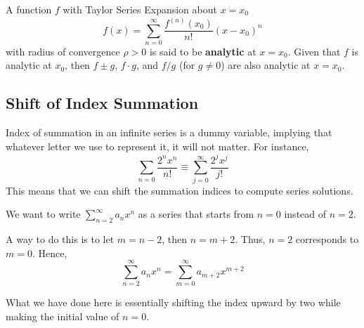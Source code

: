 A function $f$ with Taylor Series Expansion about $x = x_0$
\[ f(x) = \sum_{n=0}^\infty \frac{f^{(n)}(x_0)}{n!}{(x - x_0)}^n \]
with radius of convergence $\rho > 0$ is said to be \textbf{analytic} at $x = x_0$.
Given that $f$ is analytic at $x_0$, then $f \pm g$, $f \cdot g$, and $f / g$ (for $g \neq 0$) are
also analytic at $x = x_0$.

\subsection{Shift of Index Summation}

Index of summation in an infinite series is a dummy variable, implying that whatever letter we use to 
represent it, it will not matter. For instance,
\[ \sum_{n = 0} \frac{2^n x^n}{n!} \equiv \sum_{j=0}^\infty \frac{2^j x^j}{j!} \]
This means that we can shift the summation indices to compute series solutions.

\begin{example}
We want to write $\sum_{n=2}^\infty a_n x^n$ as a series that starts from $n=0$ instead of $n=2$.

A way to do this is to let $m = n-2$, then $n = m+2$. Thus, $n=2$ corresponds to $m = 0$. Hence,
\[ \sum_{n=2}^\infty a_n x^n = \sum_{m=0}^\infty a_{m+2} x^{m+2} \]

What we have done here is essentially shifting the index upward by two while making the initial value
of $n = 0$.
\end{example}